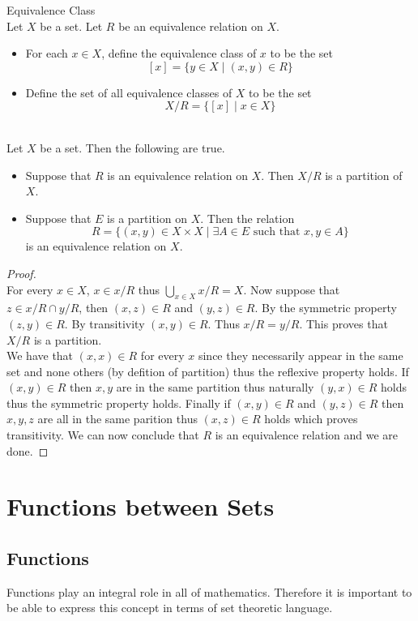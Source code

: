 \documentclass[a4paper]{article}
\begin{document}
\begin{defn}{Equivalence Class}{}\\
Let $X$ be a set. Let $R$ be an equivalence relation on $X$. 
\begin{itemize}
\item For each $x\in X$, define the equivalence class of $x$ to be the set $$[x]=\{y\in X\;|\;(x,y)\in R\}$$
\item Define the set of all equivalence classes of $X$ to be the set $$X/R=\{[x]\;|\;x\in X\}$$
\end{itemize}
\end{defn}

\begin{thm}{}{}\\
Let $X$ be a set. Then the following are true. 
\begin{itemize}
\item Suppose that $R$ is an equivalence relation on $X$. Then $X/R$ is a partition of $X$. 
\item Suppose that $E$ is a partition on $X$. Then the relation $$R=\{(x,y)\in X\times X\;|\;\exists A\in E\text{ such that }x,y\in A\}$$ is an equivalence relation on $X$. 
\end{itemize}
\begin{proof}\\
For every $x\in X$, $x\in x/R$ thus $\bigcup_{x\in X}x/R=X$. Now suppose that $z\in x/R\cap y/R$, then $(x,z)\in R$ and $(y,z)\in R$. By the symmetric property $(z,y)\in R$. By transitivity $(x,y)\in R$. Thus $x/R=y/R$. This proves that $X/R$ is a partition. \\

We have that $(x,x)\in R$ for every $x$ since they necessarily appear in the same set and none others (by defition of partition) thus the reflexive property holds. If $(x,y)\in R$ then $x,y$ are in the same partition thus naturally $(y,x)\in R$ holds thus the symmetric property holds. Finally if $(x,y)\in R$ and $(y,z)\in R$ then $x,y,z$ are all in the same parition thus $(x,z)\in R$ holds which proves transitivity. We can now conclude that $R$ is an equivalence relation and we are done. 
\end{proof}
\end{thm}

\pagebreak
\section{Functions between Sets}
\subsection{Functions}
Functions play an integral role in all of mathematics. Therefore it is important to be able to express this concept in terms of set theoretic language. 
\end{document}
